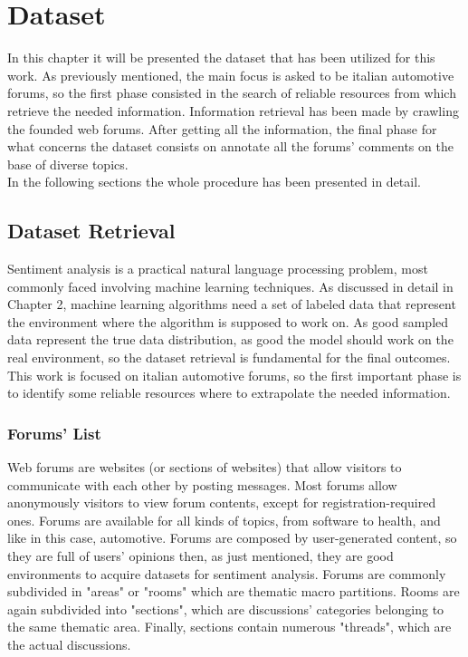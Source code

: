 
\chapter{Dataset}

In this chapter it will be presented the dataset that has been utilized for this work. As previously mentioned, the main focus is asked to be italian automotive forums, so the first phase consisted in the search of reliable resources from which retrieve the needed information. Information retrieval has been made by crawling the founded web forums. After getting all the information, the final phase for what concerns the dataset consists on annotate all the forums' comments on the base of diverse topics. \\
In the following sections the whole procedure has been presented in detail.

\section{Dataset Retrieval}

Sentiment analysis is a practical natural language processing problem, most commonly faced involving machine learning techniques. As discussed in detail in Chapter 2, machine learning algorithms need a set of labeled data that represent the environment where the algorithm is supposed to work on. As good sampled data represent the true data distribution, as good the model should work on the real environment, so the dataset retrieval is fundamental for the final outcomes.\\
This work is focused on italian automotive forums, so the first important phase is to identify some reliable resources where to extrapolate the needed information. 


\subsection{Forums' List}

Web forums are websites (or sections of websites) that allow visitors to communicate with each other by posting messages. Most forums allow anonymously visitors to view forum contents, except for registration-required ones. Forums are available for all kinds of topics, from software to health, and like in this case, automotive. Forums are composed by user-generated content, so they are full of users' opinions then, as just mentioned, they are good environments to acquire datasets for sentiment analysis. Forums are commonly subdivided in "areas" or "rooms" which are thematic macro partitions. Rooms are again subdivided into "sections", which are discussions' categories belonging to the same thematic area. Finally, sections contain numerous "threads", which are the actual discussions.\\



